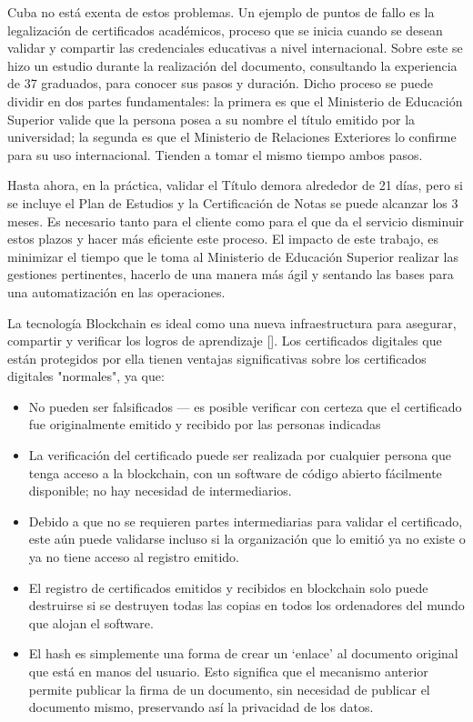 Cuba no está exenta de estos problemas. Un ejemplo de puntos de fallo es la legalización de certificados académicos, proceso que se inicia cuando se desean validar y compartir las credenciales educativas a nivel internacional. Sobre este se hizo un estudio durante la realización del documento, consultando la experiencia de 37 graduados, para conocer sus pasos y duración. 
Dicho proceso se puede dividir en dos partes fundamentales: la primera es que el Ministerio de Educación Superior valide que la persona posea a su nombre el título emitido por la universidad; la segunda es que el Ministerio de Relaciones Exteriores lo confirme para su uso internacional. 
Tienden a tomar el mismo tiempo ambos pasos.

Hasta ahora, en la práctica, validar el Título demora alrededor de 21 días, pero si se incluye el Plan de Estudios y la Certificación de Notas se puede alcanzar los 3 meses. 
Es necesario tanto para el cliente como para el que da el servicio disminuir estos plazos y hacer más eficiente este proceso.
El impacto de este trabajo, es minimizar el tiempo que le toma al Ministerio de Educación Superior realizar las gestiones pertinentes, hacerlo de una manera más ágil y sentando las bases para una automatización en las operaciones.

La tecnología Blockchain es ideal como una nueva infraestructura para asegurar, compartir y verificar los logros de aprendizaje [\cite{smolenski2016academic}]. Los certificados digitales que están protegidos por ella tienen ventajas significativas sobre los certificados digitales "normales", ya que:
\begin{itemize}
	\item No pueden ser falsificados — es posible verificar con certeza que el certificado fue originalmente emitido y recibido por las personas indicadas
	\item La verificación del certificado puede ser realizada por cualquier persona que tenga acceso a la blockchain, con un software de código abierto fácilmente disponible; no hay necesidad de intermediarios.
	\item Debido a que no se requieren partes intermediarias para validar el certificado, este aún puede validarse incluso si la organización que lo emitió ya no existe o ya no tiene acceso al registro emitido.
	\item El registro de certificados emitidos y recibidos en blockchain solo puede destruirse si se destruyen todas las copias en todos los ordenadores del mundo que alojan el software.
	\item El hash es simplemente una forma de crear un `enlace' al documento original que está en manos del usuario. Esto significa que el mecanismo anterior permite publicar la firma de un documento, sin necesidad de publicar el documento mismo, preservando así la privacidad de los datos.
\end{itemize}

